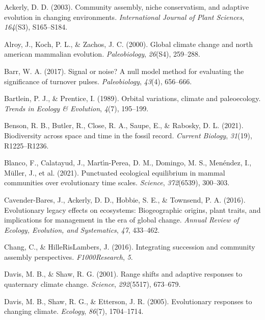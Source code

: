 \documentclass[
]{agujournal2019}
\newlength{\cslhangindent}
\newenvironment{CSLReferences}[2] %
 {\begin{list}{}{%
  \setlength{\itemindent}{0pt}
  \setlength{\leftmargin}{0pt}
  \setlength{\parsep}{0pt}
  \ifodd #1
   \setlength{\leftmargin}{\cslhangindent}
   \setlength{\itemindent}{-1\cslhangindent}
  \fi
  \setlength{\itemsep}{#2\baselineskip}}}
 {\end{list}}
\begin{document}
\label{refs}
\begin{CSLReferences}{1}{0}
Ackerly, D. D. (2003). Community assembly, niche conservatism, and
adaptive evolution in changing environments. \emph{International Journal
of Plant Sciences}, \emph{164}(S3), S165--S184.

Alroy, J., Koch, P. L., \& Zachos, J. C. (2000). Global climate change
and north american mammalian evolution. \emph{Paleobiology},
\emph{26}(S4), 259--288.

Barr, W. A. (2017). Signal or noise? A null model method for evaluating
the significance of turnover pulses. \emph{Paleobiology}, \emph{43}(4),
656--666.

Bartlein, P. J., \& Prentice, I. (1989). Orbital variations, climate and
paleoecology. \emph{Trends in Ecology \& Evolution}, \emph{4}(7),
195--199.

Benson, R. B., Butler, R., Close, R. A., Saupe, E., \& Rabosky, D. L.
(2021). Biodiversity across space and time in the fossil record.
\emph{Current Biology}, \emph{31}(19), R1225--R1236.

Blanco, F., Calatayud, J., Martı́n-Perea, D. M., Domingo, M. S.,
Menéndez, I., Müller, J., et al. (2021). Punctuated ecological
equilibrium in mammal communities over evolutionary time scales.
\emph{Science}, \emph{372}(6539), 300--303.

Cavender-Bares, J., Ackerly, D. D., Hobbie, S. E., \& Townsend, P. A.
(2016). Evolutionary legacy effects on ecosystems: Biogeographic
origins, plant traits, and implications for management in the era of
global change. \emph{Annual Review of Ecology, Evolution, and
Systematics}, \emph{47}, 433--462.

Chang, C., \& HilleRisLambers, J. (2016). Integrating succession and
community assembly perspectives. \emph{F1000Research}, \emph{5}.

Davis, M. B., \& Shaw, R. G. (2001). Range shifts and adaptive responses
to quaternary climate change. \emph{Science}, \emph{292}(5517),
673--679.

Davis, M. B., Shaw, R. G., \& Etterson, J. R. (2005). Evolutionary
responses to changing climate. \emph{Ecology}, \emph{86}(7), 1704--1714.


\end{CSLReferences}
\end{document}
